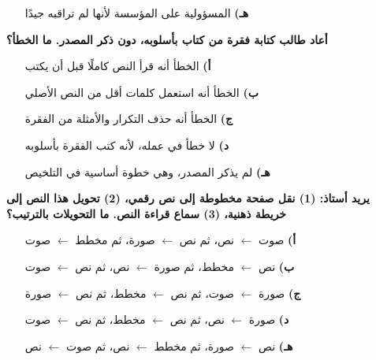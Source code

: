 \documentclass[11pt,a4paper]{article}
\begin{document}
\begin{multicols}{2}
\begin{minipage}{\linewidth}
\begin{itemize}[leftmargin=0.95cm, labelsep=4pt, itemsep=0pt, topsep=2pt, parsep=0pt]
  \item[\textbf{هـ)}] المسؤولية على المؤسسة لأنها لم تراقبه جيدًا
\end{itemize}
\end{minipage}\par\vspace{7pt plus 4pt}
\noindent\begin{minipage}{\linewidth}
\hangindent=0.7cm\textbf{أعاد طالب كتابة فقرة من كتاب بأسلوبه، دون ذكر المصدر. ما الخطأ؟}
\begin{itemize}[leftmargin=0.95cm, labelsep=4pt, itemsep=0pt, topsep=2pt, parsep=0pt]
  \item[\textbf{أ)}] الخطأ أنه قرأ النص كاملًا قبل أن يكتب
  \item[\textbf{ب)}] الخطأ أنه استعمل كلمات أقل من النص الأصلي
  \item[\textbf{ج)}] الخطأ أنه حذف التكرار والأمثلة من الفقرة
  \item[\textbf{د)}] لا خطأ في عمله، لأنه كتب الفقرة بأسلوبه
  \item[\textbf{هـ)}] لم يذكر المصدر، وهي خطوة أساسية في التلخيص
\end{itemize}
\end{minipage}\par\vspace{7pt plus 4pt}
\noindent\begin{minipage}{\linewidth}
\hangindent=0.7cm\textbf{يريد أستاذ: (1) نقل صفحة مخطوطة إلى نص رقمي، (2) تحويل هذا النص إلى خريطة ذهنية، (3) سماع قراءة النص. ما التحويلات بالترتيب؟}
\begin{itemize}[leftmargin=0.95cm, labelsep=4pt, itemsep=0pt, topsep=2pt, parsep=0pt]
  \item[\textbf{أ)}] صوت $\leftarrow$ نص، ثم نص $\leftarrow$ صورة، ثم مخطط $\leftarrow$ صوت
  \item[\textbf{ب)}] نص $\leftarrow$ مخطط، ثم صورة $\leftarrow$ نص، ثم نص $\leftarrow$ صوت
  \item[\textbf{ج)}] صورة $\leftarrow$ صوت، ثم نص $\leftarrow$ مخطط، ثم نص $\leftarrow$ صورة
  \item[\textbf{د)}] صورة $\leftarrow$ نص، ثم نص $\leftarrow$ مخطط، ثم نص $\leftarrow$ صوت
  \item[\textbf{هـ)}] نص $\leftarrow$ صورة، ثم مخطط $\leftarrow$ نص، ثم صوت $\leftarrow$ نص
\end{itemize}
\end{minipage}\par\vspace{7pt plus 4pt}
\end{multicols}
\end{document}
